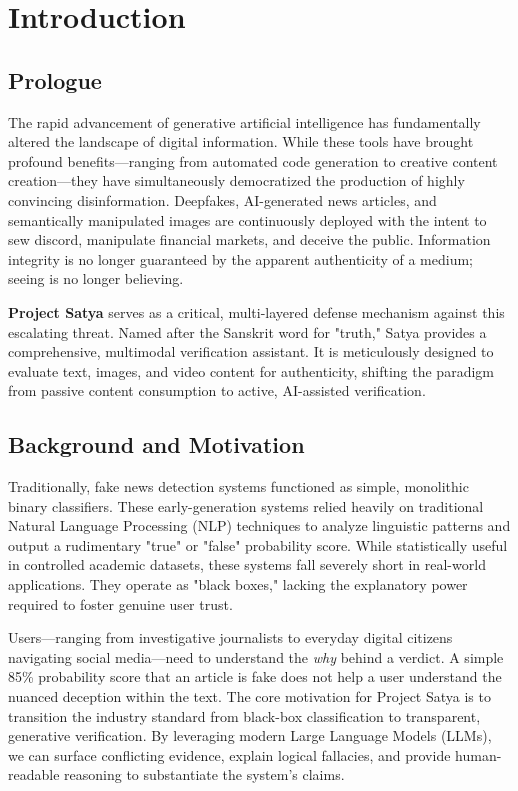 \chapter{Introduction}

\section{Prologue}
The rapid advancement of generative artificial intelligence has fundamentally altered the landscape of digital information. While these tools have brought profound benefits—ranging from automated code generation to creative content creation—they have simultaneously democratized the production of highly convincing disinformation. Deepfakes, AI-generated news articles, and semantically manipulated images are continuously deployed with the intent to sew discord, manipulate financial markets, and deceive the public. Information integrity is no longer guaranteed by the apparent authenticity of a medium; seeing is no longer believing. 

\textbf{Project Satya} serves as a critical, multi-layered defense mechanism against this escalating threat. Named after the Sanskrit word for "truth," Satya provides a comprehensive, multimodal verification assistant. It is meticulously designed to evaluate text, images, and video content for authenticity, shifting the paradigm from passive content consumption to active, AI-assisted verification.

\section{Background and Motivation}
Traditionally, fake news detection systems functioned as simple, monolithic binary classifiers. These early-generation systems relied heavily on traditional Natural Language Processing (NLP) techniques to analyze linguistic patterns and output a rudimentary "true" or "false" probability score. While statistically useful in controlled academic datasets, these systems fall severely short in real-world applications. They operate as "black boxes," lacking the explanatory power required to foster genuine user trust.

Users—ranging from investigative journalists to everyday digital citizens navigating social media—need to understand the \textit{why} behind a verdict. A simple 85\% probability score that an article is fake does not help a user understand the nuanced deception within the text. The core motivation for Project Satya is to transition the industry standard from black-box classification to transparent, generative verification. By leveraging modern Large Language Models (LLMs), we can surface conflicting evidence, explain logical fallacies, and provide human-readable reasoning to substantiate the system's claims.

